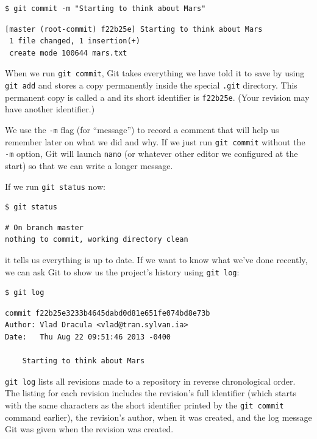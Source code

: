 \documentclass{book}
\begin{document}
\begin{verbatim}
$ git commit -m "Starting to think about Mars"
\end{verbatim}

\begin{verbatim}
[master (root-commit) f22b25e] Starting to think about Mars
 1 file changed, 1 insertion(+)
 create mode 100644 mars.txt
\end{verbatim}

When we run \texttt{git commit}, Git takes everything we have told it to
save by using \texttt{git add} and stores a copy permanently inside the
special \texttt{.git} directory. This permanent copy is called a
 and its short identifier is
\texttt{f22b25e}. (Your revision may have another identifier.)

We use the \texttt{-m} flag (for ``message'') to record a comment that
will help us remember later on what we did and why. If we just run
\texttt{git commit} without the \texttt{-m} option, Git will launch
\texttt{nano} (or whatever other editor we configured at the start) so
that we can write a longer message.

If we run \texttt{git status} now:

\begin{verbatim}
$ git status
\end{verbatim}

\begin{verbatim}
# On branch master
nothing to commit, working directory clean
\end{verbatim}

it tells us everything is up to date. If we want to know what we've done
recently, we can ask Git to show us the project's history using
\texttt{git log}:

\begin{verbatim}
$ git log
\end{verbatim}

\begin{verbatim}
commit f22b25e3233b4645dabd0d81e651fe074bd8e73b
Author: Vlad Dracula <vlad@tran.sylvan.ia>
Date:   Thu Aug 22 09:51:46 2013 -0400

    Starting to think about Mars
\end{verbatim}

\texttt{git log} lists all revisions made to a repository in reverse
chronological order. The listing for each revision includes the
revision's full identifier (which starts with the same characters as the
short identifier printed by the \texttt{git commit} command earlier),
the revision's author, when it was created, and the log message Git was
given when the revision was created.
\end{document}
